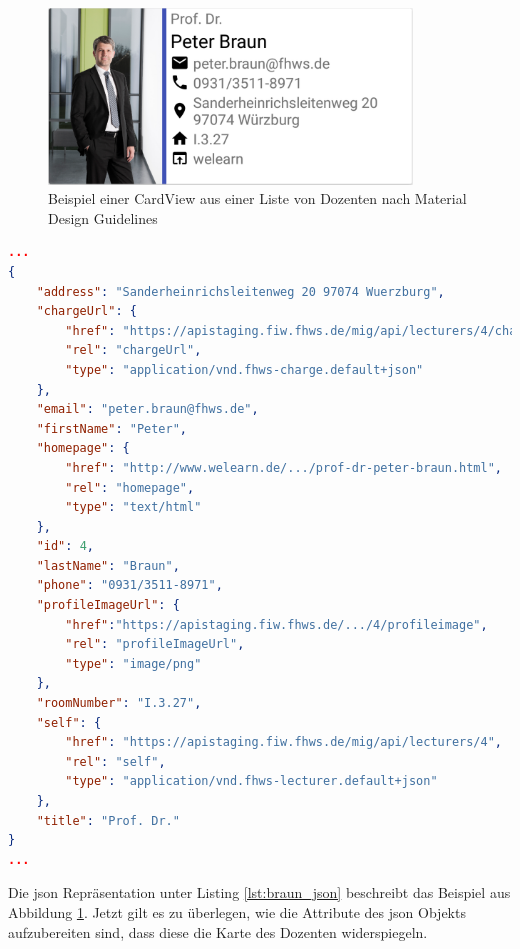 \begin{figure}[H]
	\begin{center}
		\includegraphics[width=0.86\textwidth]{images/card.png}
		\caption{Beispiel einer CardView aus einer Liste von Dozenten nach Material Design Guidelines}
		\label{fig:card}
	\end{center}
\end{figure}

\begin{lstlisting}[label=lst:braun_json,
language=json,
firstnumber=1,
caption=Demo Daten eines Dozenten]	
...			   
{
	"address": "Sanderheinrichsleitenweg 20 97074 Wuerzburg",
	"chargeUrl": {
		"href": "https://apistaging.fiw.fhws.de/mig/api/lecturers/4/charges",
		"rel": "chargeUrl",
		"type": "application/vnd.fhws-charge.default+json"
	},
	"email": "peter.braun@fhws.de",
	"firstName": "Peter",
	"homepage": {
		"href": "http://www.welearn.de/.../prof-dr-peter-braun.html",
		"rel": "homepage",
		"type": "text/html"
	},
	"id": 4,
	"lastName": "Braun",
	"phone": "0931/3511-8971",
	"profileImageUrl": {
		"href":"https://apistaging.fiw.fhws.de/.../4/profileimage",
		"rel": "profileImageUrl",
		"type": "image/png"
	},
	"roomNumber": "I.3.27",
	"self": {
		"href": "https://apistaging.fiw.fhws.de/mig/api/lecturers/4",
		"rel": "self",
		"type": "application/vnd.fhws-lecturer.default+json"
	},
	"title": "Prof. Dr."
}
...
\end{lstlisting}

Die  \acf{json} Repräsentation unter Listing \ref{lst:braun_json} beschreibt das Beispiel aus Abbildung \ref{fig:card}.
Jetzt gilt es zu überlegen, wie die Attribute des \ac{json} Objekts aufzubereiten sind, dass diese die Karte des Dozenten widerspiegeln. 

